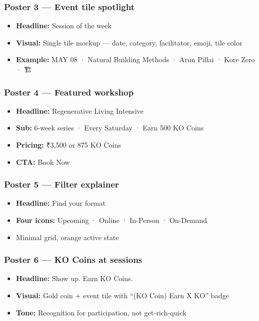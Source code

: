 \documentclass[11pt,a4paper]{report}
\begin{document}
\subsubsection{Poster 3 --- Event tile spotlight}
\begin{itemize}
  \item \textbf{Headline:} Session of the week
  \item \textbf{Visual:} Single tile mockup --- date, category, facilitator, emoji, tile color
  \item \textbf{Example:} MAY 08 · Natural Building Methods · Arun Pillai · Kore Zero · 🏗️
\end{itemize}

\subsubsection{Poster 4 --- Featured workshop}
\begin{itemize}
  \item \textbf{Headline:} Regenerative Living Intensive
  \item \textbf{Sub:} 6-week series · Every Saturday · Earn 500 KO Coins
  \item \textbf{Pricing:} ₹3,500 or 875 KO Coins
  \item \textbf{CTA:} Book Now
\end{itemize}

\subsubsection{Poster 5 --- Filter explainer}
\begin{itemize}
  \item \textbf{Headline:} Find your format
  \item \textbf{Four icons:} Upcoming · Online · In-Person · On-Demand
  \item Minimal grid, orange active state
\end{itemize}

\subsubsection{Poster 6 --- KO Coins at sessions}
\begin{itemize}
  \item \textbf{Headline:} Show up. Earn KO Coins.
  \item \textbf{Visual:} Gold coin + event tile with “(KO Coin) Earn X KO” badge
  \item \textbf{Tone:} Recognition for participation, not get-rich-quick
\end{itemize}
\end{document}
